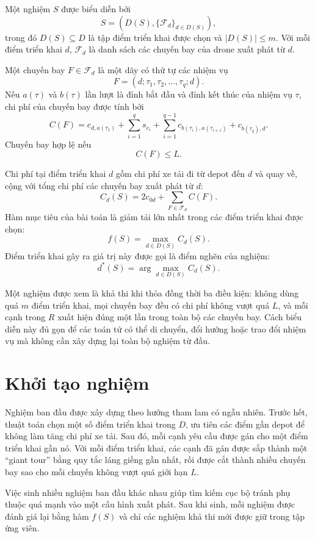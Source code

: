 Một nghiệm \(S\) được biểu diễn bởi
\[
S=\left(D(S),\{\mathcal{F}_d\}_{d\in D(S)}\right),
\]
trong đó \(D(S)\subseteq D\) là tập điểm triển khai được chọn và \(|D(S)|\leq m\). Với mỗi điểm triển khai \(d\), \(\mathcal{F}_d\) là danh sách các chuyến bay của drone xuất phát từ \(d\).

Một chuyến bay \(F\in\mathcal{F}_d\) là một dãy có thứ tự các nhiệm vụ
\[
F=(d;\tau_1,\tau_2,\ldots,\tau_q;d).
\]
Nếu \(a(\tau)\) và \(b(\tau)\) lần lượt là đỉnh bắt đầu và đỉnh kết thúc của nhiệm vụ \(\tau\), chi phí của chuyến bay được tính bởi
\[
C(F)=c_{d,a(\tau_1)}
+
\sum_{i=1}^{q} s_{e_i}
+
\sum_{i=1}^{q-1} c_{b(\tau_i),a(\tau_{i+1})}
+
c_{b(\tau_q),d}.
\]
Chuyến bay hợp lệ nếu
\[
C(F)\leq L.
\]

Chi phí tại điểm triển khai \(d\) gồm chi phí xe tải đi từ depot đến \(d\) và quay về, cộng với tổng chi phí các chuyến bay xuất phát từ \(d\):
\[
C_d(S)=2c_{0d}+\sum_{F\in\mathcal{F}_d} C(F).
\]
Hàm mục tiêu của bài toán là giảm tải lớn nhất trong các điểm triển khai được chọn:
\[
f(S)=\max_{d\in D(S)} C_d(S).
\]
Điểm triển khai gây ra giá trị này được gọi là điểm nghẽn của nghiệm:
\[
d^*(S)=\arg\max_{d\in D(S)} C_d(S).
\]

Một nghiệm được xem là khả thi khi thỏa đồng thời ba điều kiện: không dùng quá \(m\) điểm triển khai, mọi chuyến bay đều có chi phí không vượt quá \(L\), và mỗi cạnh trong \(R\) xuất hiện đúng một lần trong toàn bộ các chuyến bay. Cách biểu diễn này đủ gọn để các toán tử có thể di chuyển, đổi hướng hoặc trao đổi nhiệm vụ mà không cần xây dựng lại toàn bộ nghiệm từ đầu.

\section{Khởi tạo nghiệm}

Nghiệm ban đầu được xây dựng theo hướng tham lam có ngẫu nhiên. Trước hết, thuật toán chọn một số điểm triển khai trong \(D\), ưu tiên các điểm gần depot để không làm tăng chi phí xe tải. Sau đó, mỗi cạnh yêu cầu được gán cho một điểm triển khai gần nó. Với mỗi điểm triển khai, các cạnh đã gán được sắp thành một ``giant tour'' bằng quy tắc láng giềng gần nhất, rồi được cắt thành nhiều chuyến bay sao cho mỗi chuyến không vượt quá giới hạn \(L\).

Việc sinh nhiều nghiệm ban đầu khác nhau giúp tìm kiếm cục bộ tránh phụ thuộc quá mạnh vào một cấu hình xuất phát. Sau khi sinh, mỗi nghiệm được đánh giá lại bằng hàm \(f(S)\) và chỉ các nghiệm khả thi mới được giữ trong tập ứng viên.

